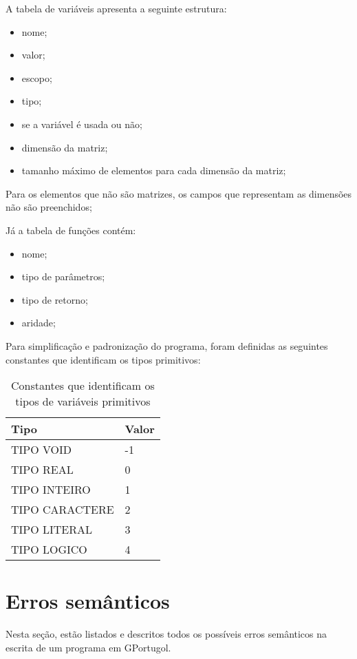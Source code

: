 \documentclass[
12pt,				%
a4paper,			%
english,			%
french,				%
spanish,			%
brazil,				%
article
]{abntex2}
\begin{document}
A tabela de variáveis apresenta a seguinte estrutura:

\begin{itemize}
	\item nome;
	\item valor;
	\item escopo;
	\item tipo;
	\item se a variável é usada ou não;
	\item dimensão da matriz;
	\item tamanho máximo de elementos para cada dimensão da matriz; 
\end{itemize}

Para os elementos que não são matrizes, os campos que representam as dimensões não são preenchidos;

Já a tabela de funções contém:

\begin{itemize}
	\item nome;
	\item tipo de parâmetros;
	\item tipo de retorno;
	\item aridade;
\end{itemize}

Para simplificação e padronização do programa, foram definidas as seguintes constantes que identificam os tipos primitivos:

\begin{table}[h]
	\caption{Constantes que identificam os tipos de variáveis primitivos}
	\label{tbl-divisao-sistema}
	\centering
	\begin{tabular}{| p{47mm} | p{100mm} | }\hline		
		\textbf{Tipo} & 
		\textbf{Valor}\\
		\hline
		TIPO VOID & -1\\
		\hline
		TIPO REAL & 0\\
		\hline
		TIPO INTEIRO & 1\\
		\hline
		TIPO CARACTERE & 2\\
		\hline
		TIPO LITERAL & 3\\
		\hline
		TIPO LOGICO & 4\\
		\hline
	\end{tabular}
\end{table}

\section{Erros semânticos}
Nesta seção, estão listados e descritos todos os possíveis erros semânticos na escrita de um programa em GPortugol.
\end{document}
